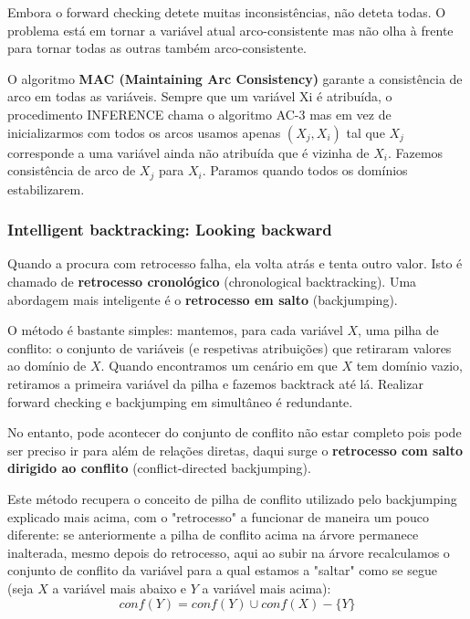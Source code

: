 \documentclass[11pt]{article}
\begin{document}
Embora o forward checking detete muitas inconsistências, não deteta todas. O problema está em tornar a variável atual arco-consistente mas não olha à frente para tornar todas as outras também arco-consistente.\vspace{4pt}

O algoritmo \textbf{MAC (Maintaining Arc Consistency)} garante a consistência de arco em todas as variáveis. Sempre que um variável Xi é atribuída, o procedimento INFERENCE chama o algoritmo AC-3 mas em vez de inicializarmos com todos os arcos usamos apenas $(X_j, X_i)$ tal que $X_j$ corresponde a uma variável ainda não atribuída que é vizinha de $X_i$. Fazemos consistência de arco de $X_j$ para $X_i$. Paramos quando todos os domínios estabilizarem.

\subsubsection{Intelligent backtracking: Looking backward}

Quando a procura com retrocesso falha, ela volta atrás e tenta outro valor. Isto é chamado de \textbf{retrocesso cronológico} (chronological backtracking). Uma abordagem mais inteligente é o \textbf{retrocesso em salto} (backjumping).\vspace{4pt}

O método é bastante simples: mantemos, para cada variável $X$, uma pilha de conflito: o conjunto de variáveis (e respetivas atribuições) que retiraram valores ao domínio de $X$. Quando encontramos um cenário em que $X$ tem domínio vazio, retiramos a primeira variável da pilha e fazemos backtrack até lá. Realizar forward checking e backjumping em simultâneo é redundante.\vspace{4pt}

No entanto, pode acontecer do conjunto de conflito não estar completo pois pode ser preciso ir para além de relações diretas, daqui surge o \textbf{retrocesso com salto dirigido ao conflito} (conflict-directed backjumping).

Este método recupera o conceito de pilha de conflito utilizado pelo backjumping explicado mais acima, com o "retrocesso" a funcionar de maneira um pouco diferente: se anteriormente a pilha de conflito acima na árvore permanece inalterada, mesmo depois do retrocesso, aqui ao subir na árvore recalculamos o conjunto de conflito da variável para a qual estamos a "saltar" como se segue (seja $X$ a variável mais abaixo e $Y$ a variável mais acima):
\begin{equation*}
    conf(Y) = conf(Y)\cup conf(X)-\{Y\}
\end{equation*}
\end{document}
